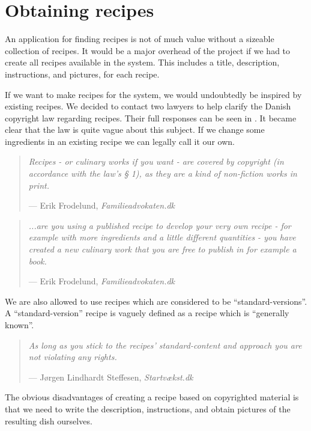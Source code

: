 \section{Obtaining recipes}
An application for finding recipes is not of much value without a sizeable collection of recipes. It would be a major overhead of the project if we had to create all recipes available in the system. This includes a title, description, instructions, and pictures, for each recipe.

If we want to make recipes for the system, we would undoubtedly be inspired by existing recipes. We decided to contact two lawyers to help clarify the Danish copyright law regarding recipes. Their full responses can be seen in . It became clear that the law is quite vague about this subject. If we change some ingredients in an existing recipe we can legally call it our own.
\begin{quote}
\textit{Recipes - or culinary works if you want - are covered by copyright (in accordance with the law's § 1), as they are a kind of non-fiction works in print.}\par\raggedleft--- \textup{Erik Frodelund}, \textit{Familieadvokaten.dk}
\end{quote}
\begin{quote}

\textit{...are you using a published recipe to develop your very own recipe - for example with more ingredients and a little different quantities - you have created a new culinary work that you are free to publish in for example a book.}\par\raggedleft--- \textup{Erik Frodelund}, \textit{Familieadvokaten.dk}
\end{quote}
We are also allowed to use recipes which are considered to be ``standard-versions''. A ``standard-version'' recipe is vaguely defined as a recipe which is ``generally known''.
\begin{quote}
\textit{As long as you stick to the recipes' standard-content and approach you are not violating any rights.}\par\raggedleft--- \textup{Jørgen Lindhardt Steffesen}, \textit{Startvækst.dk}
\end{quote}
The obvious disadvantages of creating a recipe based on copyrighted material is that we need to write the description, instructions, and obtain pictures of the resulting dish ourselves.

